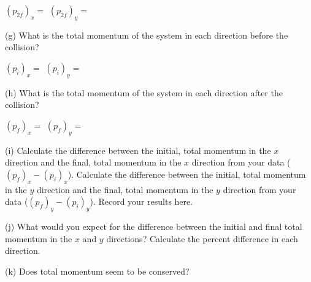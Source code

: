 \((p_{2f})_{x} =\)  \hfill{}\( (p_{2f})_{y}= \)  \hfill{}
\vspace{7mm}


(g) What is the total momentum of the system in each direction before the 
collision?
\vspace{7mm}

\( (p_{i})_{x} =\)  \hfill{}\( (p_{i})_{y}= \) \hfill{} 
\vspace{7mm}

(h) What is the total momentum of the system in each direction after the 
collision?
\vspace{7mm}

\( (p_{f})_{x} =\)  \hfill{}\( (p_{f})_{y}= \) \hfill{} 
\vspace{7mm}

\newpage

(i) Calculate the difference between the initial, total momentum in the $x$ direction and the final, total momentum in the $x$ direction from your data ($(p_{f})_{x} - (p_{i})_{x}$).
Calculate the difference between the initial, total momentum in the $y$ direction and the final, total momentum in the $y$ direction from your data ($(p_{f})_{y} - (p_{i})_{y}$).
Record your results here.
\vspace{50mm}

(j) What would you expect for the difference between the initial and final total momentum in the $x$ and $y$ directions? Calculate the percent difference in each direction.
\vspace{50mm}

(k) Does total momentum seem to be conserved?
